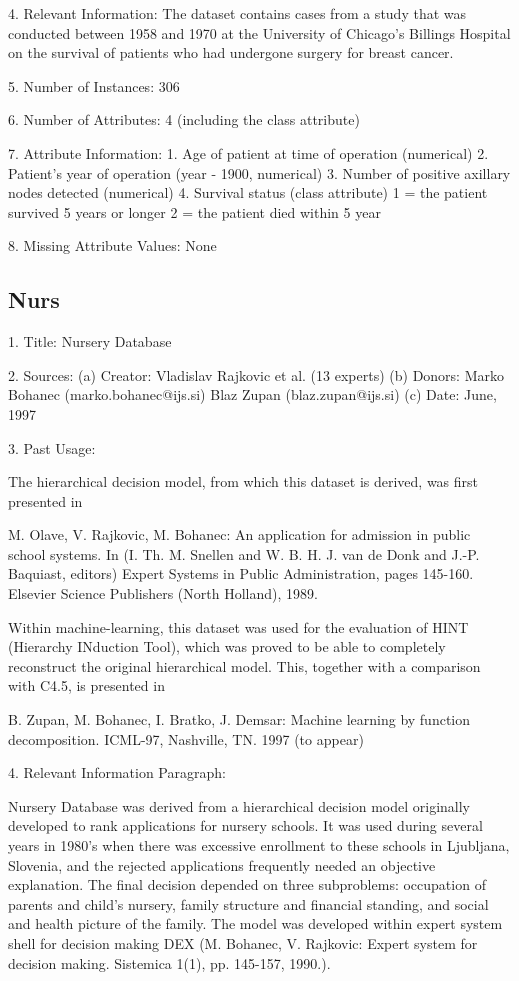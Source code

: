 \documentclass[letterpaper,12pt,titlepage,oneside,final]{book}
\begin{document}
	4. Relevant Information:
	The dataset contains cases from a study that was conducted between
	1958 and 1970 at the University of Chicago's Billings Hospital on
	the survival of patients who had undergone surgery for breast
	cancer.
	
	5. Number of Instances: 306
	
	6. Number of Attributes: 4 (including the class attribute)
	
	7. Attribute Information:
	1. Age of patient at time of operation (numerical)
	2. Patient's year of operation (year - 1900, numerical)
	3. Number of positive axillary nodes detected (numerical)
	4. Survival status (class attribute)
	1 = the patient survived 5 years or longer
	2 = the patient died within 5 year
	
	8. Missing Attribute Values: None
	
	\subsection{Nurs}
	
	1. Title: Nursery Database
	
	2. Sources:
	(a) Creator: Vladislav Rajkovic et al. (13 experts)
	(b) Donors: Marko Bohanec   (marko.bohanec@ijs.si)
	Blaz Zupan      (blaz.zupan@ijs.si)
	(c) Date: June, 1997
	
	3. Past Usage:
	
	The hierarchical decision model, from which this dataset is
	derived, was first presented in 
	
	M. Olave, V. Rajkovic, M. Bohanec: An application for admission in
	public school systems. In (I. Th. M. Snellen and W. B. H. J. van de
	Donk and J.-P. Baquiast, editors) Expert Systems in Public
	Administration, pages 145-160. Elsevier Science Publishers (North
	Holland), 1989.
	
	Within machine-learning, this dataset was used for the evaluation
	of HINT (Hierarchy INduction Tool), which was proved to be able to
	completely reconstruct the original hierarchical model. This,
	together with a comparison with C4.5, is presented in
	
	B. Zupan, M. Bohanec, I. Bratko, J. Demsar: Machine learning by
	function decomposition. ICML-97, Nashville, TN. 1997 (to appear)
	
	4. Relevant Information Paragraph:
	
	Nursery Database was derived from a hierarchical decision model
	originally developed to rank applications for nursery schools. It
	was used during several years in 1980's when there was excessive
	enrollment to these schools in Ljubljana, Slovenia, and the
	rejected applications frequently needed an objective
	explanation. The final decision depended on three subproblems:
	occupation of parents and child's nursery, family structure and
	financial standing, and social and health picture of the family.
	The model was developed within expert system shell for decision
	making DEX (M. Bohanec, V. Rajkovic: Expert system for decision
	making. Sistemica 1(1), pp. 145-157, 1990.).
	
\end{document}
